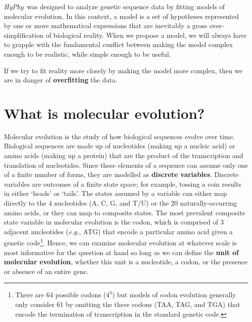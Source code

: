 \documentclass[12pt,twoside,openright]{book}
\newcommand{\hyphy}{\textit{HyPhy}}
\begin{document}
\vspace{0.5in}

\hyphy\ was designed to analyze genetic sequence data by fitting models of molecular evolution.  In this context, a model is a set of hypotheses represented by one or more mathematical expressions that are inevitably a gross over-simplification of biological reality.  When we propose a model, we will always have to grapple with the fundamental conflict between making the model complex enough to be realistic, while simple enough to be useful.  

  If we try to fit reality more closely by making the model more complex, then we are in danger of \textbf{overfitting} the data.  
  
  

\section {What is molecular evolution?}

Molecular evolution is the study of how biological sequences evolve over time.  Biological sequences are made up of nucleotides (making up a nucleic acid) or amino acids (making up a protein) that are the product of the transcription and translation of nucleotides.  Since these elements of a sequence can assume only one of a finite number of forms, they are modelled as \textbf{discrete variables}.  Discrete variables are outcomes of a finite state space; for example, tossing a coin results in either `heads' or `tails'.  The states assumed by a variable can either map directly to the 4 nucleotides (A, C, G, and T/U) or the 20 naturally-occurring amino acids, or they can map to composite states.  The most prevalent composite state variable in molecular evolution is the codon, which is comprised of 3 adjacent nucleotides ({\it e.g.}, ATG) that encode a particular amino acid given a genetic code\footnote{There are 64 possible codons ($4^3$) but models of codon evolution generally only consider 61 by omitting the three codons (TAA, TAG, and TGA) that encode the termination of transcription in the standard genetic code.}.  Hence, we can examine molecular evolution at whatever scale is most informative for the question at hand so long as we can define the \textbf{unit of molecular evolution}, whether this unit is a nucleotide, a codon, or the presence or absence of an entire gene. 

\end{document}

